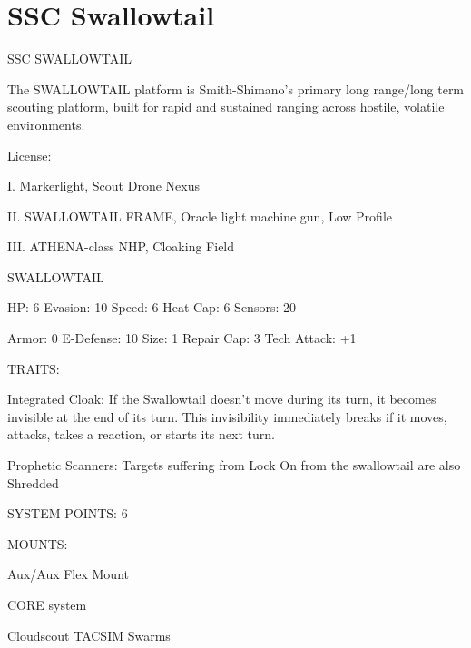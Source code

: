 \section{SSC Swallowtail}

                                                           
                                          SSC SWALLOWTAIL  

The SWALLOWTAIL platform is Smith-Shimano’s primary long range/long term scouting platform,  
built for rapid and sustained ranging across hostile, volatile environments.   

                                                     License:
 

                                                                                                                


I. Markerlight, Scout Drone Nexus
 
II. SWALLOWTAIL FRAME,  Oracle light machine gun, Low Profile
 
III. ATHENA-class NHP, Cloaking Field
 

                                                SWALLOWTAIL 

  HP: 6           Evasion: 10                            Speed: 6            Heat Cap: 6         Sensors: 20 

  Armor: 0        E-Defense: 10                          Size: 1             Repair Cap: 3       Tech Attack:  
                                                                                                 +1 

                                                      TRAITS: 

  Integrated Cloak: If the Swallowtail doesn’t move during its turn, it becomes invisible at the end of its  
  turn. This invisibility immediately breaks if it moves, attacks, takes a reaction, or starts its next turn.
 
  Prophetic Scanners: Targets suffering from Lock On from the swallowtail are also Shredded 

                                               SYSTEM POINTS: 6 

                                                     MOUNTS: 

  Aux/Aux                                                 Flex Mount 

                                                   CORE system 

                                          Cloudscout TACSIM Swarms  

